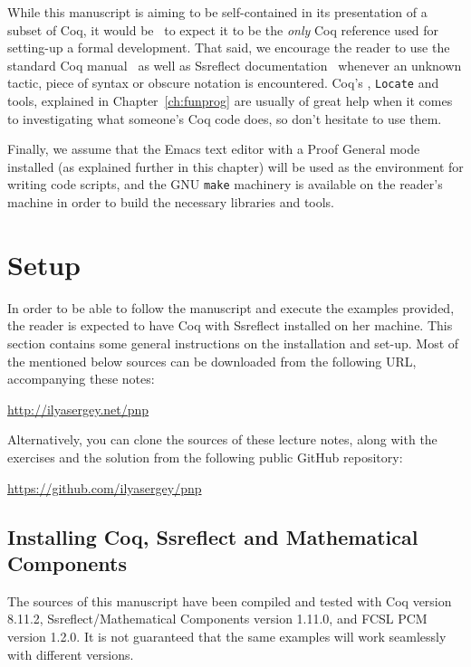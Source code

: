 While this manuscript is aiming to be self-contained in its presentation of a subset of Coq, it would be \naive~to expect it to be the \textit{only} Coq reference used for setting-up a formal development. That said, we encourage the reader to use the standard Coq manual~\cite{Coq-manual} as well as Ssreflect documentation~\cite{Gontier-al:TR} whenever an unknown tactic, piece of syntax or obscure notation is encountered. Coq's , \texttt{Locate} and  tools, explained in Chapter~\ref{ch:funprog} are usually of great help when it comes to investigating what someone's Coq code does, so don't hesitate to use them.


Finally, we assume that the Emacs text editor  with a Proof General mode installed  (as explained further in this chapter) will be used as the environment for writing code scripts, and the GNU \texttt{make} machinery is available on the reader's machine in order to build the necessary libraries and tools.


\section{Setup}




In order to be able to follow the manuscript and execute the examples provided, the reader is expected to have Coq with Ssreflect installed on her machine. This section contains some general instructions on the installation and set-up. Most of the mentioned below sources can be downloaded from the following URL, accompanying these notes:


 \begin{center} \url{http://ilyasergey.net/pnp} \end{center} 


Alternatively, you can clone the sources of these lecture notes, along with the exercises and the solution from the following public GitHub repository:


 \begin{center} \url{https://github.com/ilyasergey/pnp} \end{center} 


\subsection{Installing Coq, Ssreflect and Mathematical Components}




The sources of this manuscript have been compiled and tested with Coq version 8.11.2, Ssreflect/Mathematical Components version 1.11.0, and FCSL PCM version 1.2.0. It is not guaranteed that the same examples will work seamlessly with different versions. 


